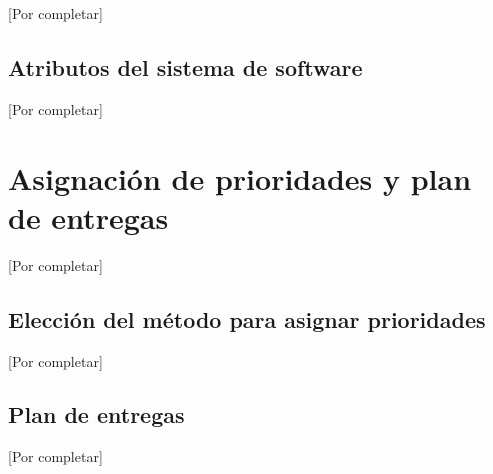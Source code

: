 \documentclass[paper=a4,oneside,fontsize=12pt]{article}
\begin{document}
	[Por completar]
	
	\subsection{Atributos del sistema de software}
	
	[Por completar]
	
	\section{Asignación de prioridades y plan de entregas}

	[Por completar]
	
	\subsection{Elección del método para asignar prioridades}
	
	[Por completar]
		
		
	\subsection{Plan de entregas}
	
	[Por completar]	
	
\end{document}
